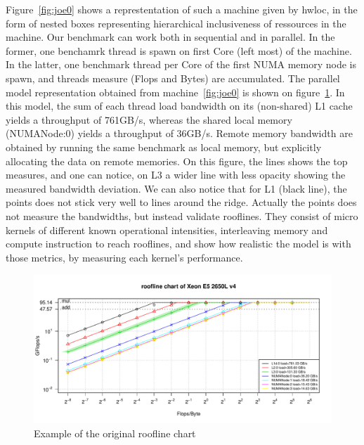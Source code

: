 \documentclass[runningheads,a4paper]{llncs}
\begin{document}
Figure~\ref{fig:joe0} shows a represtentation of such a machine given by hwloc, in the form of nested boxes representing
hierarchical inclusiveness of ressources in the machine. Our benchmark can work both in sequential and in parallel. In the former,
one benchamrk thread is spawn on first Core (left most) of the machine. In the latter, one benchmark thread per Core of the first
NUMA memory node is spawn, and threads measure (Flops and Bytes) are accumulated. The parallel model representation obtained from
machine~\ref{fig:joe0} is shown on figure~\ref{fig:orig_model}. In this model, the sum of each thread load bandwidth on its (non-shared)
 L1 cache yields a throughput of 761GB/s, whereas the shared local memory (NUMANode:0) yields a throughput of 36GB/s.
Remote memory bandwidth are obtained by running the same benchmark as local memory, but explicitly allocating the data on remote
 memories.
On this figure, the lines shows the top measures, and one can notice, on L3 a wider line with less opacity showing the measured
bandwidth deviation.
We can also notice that for L1 (black line), the points does not stick very well to lines around the ridge. Actually the points
does not measure the bandwidths, but instead validate rooflines. They consist of micro kernels of different known operational
intensities, interleaving memory and compute instruction to reach rooflines, and show how realistic the model is with those
metrics, by measuring each kernel's performance.

\begin{figure}
  \centering
  \includegraphics[width=\textwidth]{pictures/roofline_model}
  \caption{Example of the original roofline chart}
  \label{fig:orig_model}
\end{figure}

\end{document}
